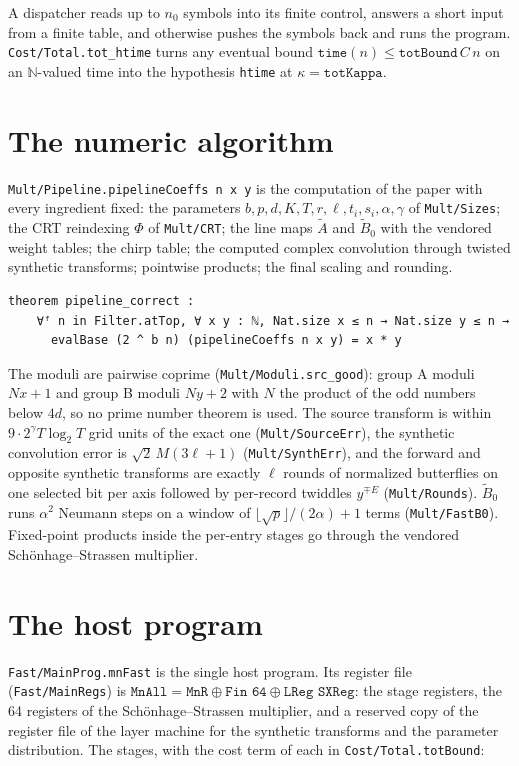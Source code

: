 \documentclass[11pt]{amsart}
\theoremstyle{remark}
\begin{document}
A dispatcher reads up to $n_0$ symbols into its finite control, answers a short input from a
finite table, and otherwise pushes the symbols back and runs the program.
\texttt{Cost/Total.tot\_htime} turns any eventual bound $\texttt{time}(n)\le\texttt{totBound}\,C\,n$
on an $\mathbb N$-valued time into the hypothesis \texttt{htime} at $\kappa=\texttt{totKappa}$.

\section{The numeric algorithm}

\texttt{Mult/Pipeline.pipelineCoeffs n x y} is the computation of the paper with every
ingredient fixed: the parameters $b,p,d,K,T,r,\ell,t_i,s_i,\alpha,\gamma$ of
\texttt{Mult/Sizes}; the CRT reindexing $\Phi$ of \texttt{Mult/CRT}; the line maps
$\widetilde A$ and $\widetilde B_0$ with the vendored weight tables; the chirp table; the
computed complex convolution through twisted synthetic transforms; pointwise products; the
final scaling and rounding.

\begin{lstlisting}
theorem pipeline_correct :
    ∀ᶠ n in Filter.atTop, ∀ x y : ℕ, Nat.size x ≤ n → Nat.size y ≤ n →
      evalBase (2 ^ b n) (pipelineCoeffs n x y) = x * y
\end{lstlisting}

The moduli are pairwise coprime (\texttt{Mult/Moduli.src\_good}): group A moduli $Nx+1$ and
group B moduli $Ny+2$ with $N$ the product of the odd numbers below $4d$, so no prime number
theorem is used. The source transform is within $9\cdot 2^\gamma T\log_2T$ grid units of the
exact one (\texttt{Mult/SourceErr}), the synthetic convolution error is
$\sqrt2\,M(3\ell+1)$ (\texttt{Mult/SynthErr}), and the forward and opposite synthetic
transforms are exactly $\ell$ rounds of normalized butterflies on one selected bit per axis
followed by per-record twiddles $y^{\mp E}$ (\texttt{Mult/Rounds}). $\widetilde B_0$ runs
$\alpha^2$ Neumann steps on a window of $\lfloor\sqrt p\rfloor/(2\alpha)+1$ terms
(\texttt{Mult/FastB0}). Fixed-point products inside the per-entry stages go through the
vendored Schönhage--Strassen multiplier.

\section{The host program}

\texttt{Fast/MainProg.mnFast} is the single host program. Its register file
(\texttt{Fast/MainRegs}) is $\texttt{MnAll}=\texttt{MnR}\oplus\texttt{Fin 64}\oplus
\texttt{LReg SXReg}$: the stage registers, the 64 registers of the Schönhage--Strassen
multiplier, and a reserved copy of the register file of the layer machine for the synthetic
transforms and the parameter distribution. The stages, with the cost term of each in
\texttt{Cost/Total.totBound}:
\end{document}
